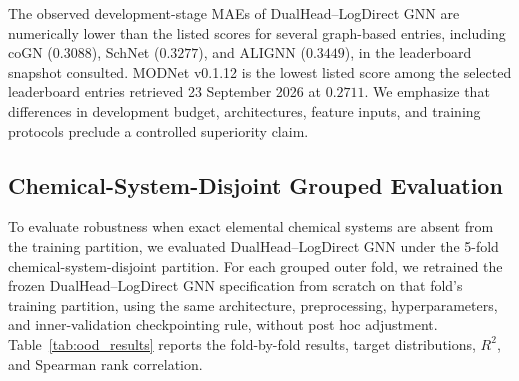 \documentclass[final,3p,times]{elsarticle}
\begin{document}
The observed development-stage MAEs of DualHead--LogDirect GNN are numerically lower than the listed scores for several graph-based entries, including coGN ($0.3088$), SchNet ($0.3277$), and ALIGNN ($0.3449$), in the leaderboard snapshot consulted. MODNet v0.1.12 is the lowest listed score among the selected leaderboard entries retrieved 23 September 2026 at $0.2711$. We emphasize that differences in development budget, architectures, feature inputs, and training protocols preclude a controlled superiority claim.

\subsection{Chemical-System-Disjoint Grouped Evaluation}
To evaluate robustness when exact elemental chemical systems are absent from the training partition, we evaluated DualHead--LogDirect GNN under the 5-fold chemical-system-disjoint partition. For each grouped outer fold, we retrained the frozen DualHead--LogDirect GNN specification from scratch on that fold's training partition, using the same architecture, preprocessing, hyperparameters, and inner-validation checkpointing rule, without post hoc adjustment. Table~\ref{tab:ood_results} reports the fold-by-fold results, target distributions, $R^2$, and Spearman rank correlation.
\end{document}
